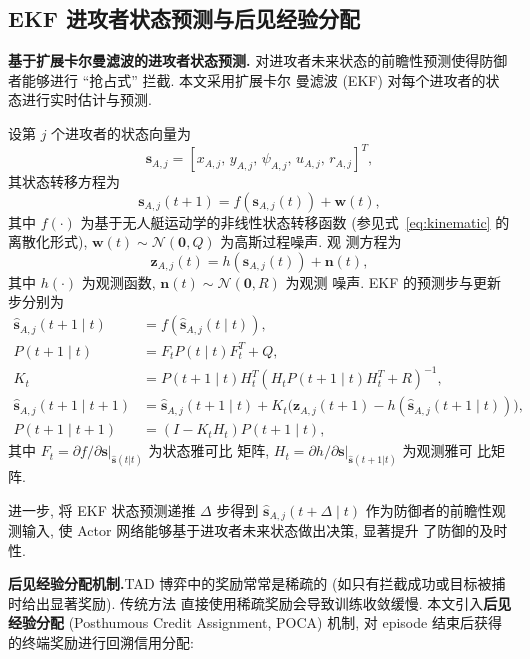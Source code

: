 \subsection{EKF 进攻者状态预测与后见经验分配}
\label{subsec:ekf_predict}
\textbf{基于扩展卡尔曼滤波的进攻者状态预测.}\quad
对进攻者未来状态的前瞻性预测使得防御者能够进行 ``抢占式'' 拦截. 本文采用扩展卡尔
曼滤波 (EKF) 对每个进攻者的状态进行实时估计与预测.

设第 $j$ 个进攻者的状态向量为
\begin{equation}
\mathbf{s}_{A,j} = [x_{A,j},\, y_{A,j},\, \psi_{A,j},\, u_{A,j},\, r_{A,j}]^T,
\end{equation}
其状态转移方程为
\begin{equation}
\mathbf{s}_{A,j}(t+1) = f(\mathbf{s}_{A,j}(t)) + \mathbf{w}(t),
\end{equation}
其中 $f(\cdot)$ 为基于无人艇运动学的非线性状态转移函数 (参见式~\eqref{eq:kinematic}
的离散化形式), $\mathbf{w}(t)\sim\mathcal{N}(\mathbf{0}, Q)$ 为高斯过程噪声. 观
测方程为
\begin{equation}
\mathbf{z}_{A,j}(t) = h(\mathbf{s}_{A,j}(t)) + \mathbf{n}(t),
\end{equation}
其中 $h(\cdot)$ 为观测函数, $\mathbf{n}(t)\sim\mathcal{N}(\mathbf{0}, R)$ 为观测
噪声. EKF 的预测步与更新步分别为
\begin{align}
\hat{\mathbf{s}}_{A,j}(t+1\mid t) &= f(\hat{\mathbf{s}}_{A,j}(t\mid t)), \label{eq:ekf_pred_x}\\
P(t+1\mid t) &= F_t P(t\mid t) F_t^T + Q, \label{eq:ekf_pred_P}\\
K_t &= P(t+1\mid t) H_t^T (H_t P(t+1\mid t) H_t^T + R)^{-1}, \label{eq:ekf_gain}\\
\hat{\mathbf{s}}_{A,j}(t+1\mid t+1) &= \hat{\mathbf{s}}_{A,j}(t+1\mid t) + K_t\big(\mathbf{z}_{A,j}(t+1) - h(\hat{\mathbf{s}}_{A,j}(t+1\mid t))\big), \label{eq:ekf_update_x}\\
P(t+1\mid t+1) &= (I - K_t H_t) P(t+1\mid t), \label{eq:ekf_update_P}
\end{align}
其中 $F_t = \partial f/\partial\mathbf{s}|_{\hat{\mathbf{s}}(t|t)}$ 为状态雅可比
矩阵, $H_t = \partial h/\partial\mathbf{s}|_{\hat{\mathbf{s}}(t+1|t)}$ 为观测雅可
比矩阵.

进一步, 将 EKF 状态预测递推 $\Delta$ 步得到 $\hat{\mathbf{s}}_{A,j}(t+\Delta\mid t)$
作为防御者的前瞻性观测输入, 使 Actor 网络能够基于进攻者未来状态做出决策, 显著提升
了防御的及时性.

\textbf{后见经验分配机制.}\quad TAD 博弈中的奖励常常是稀疏的 (如只有拦截成功或目标被捕时给出显著奖励). 传统方法
直接使用稀疏奖励会导致训练收敛缓慢. 本文引入\textbf{后见经验分配} (Posthumous
Credit Assignment, POCA) 机制, 对 episode 结束后获得的终端奖励进行回溯信用分配:

